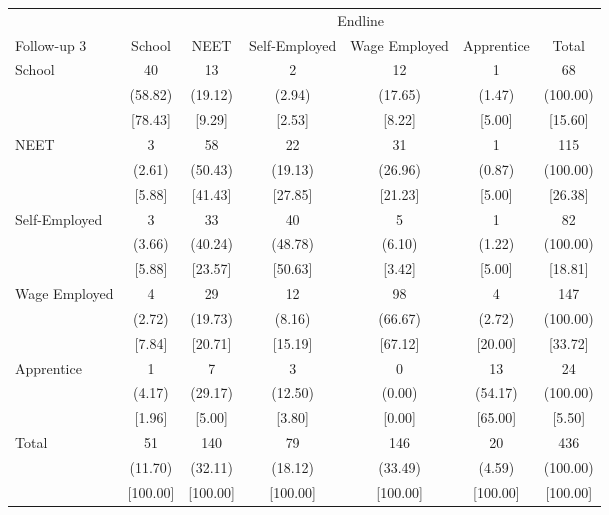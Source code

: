{
\def\sym#1{\ifmmode^{#1}\else\(^{#1}\)\fi}
\begin{tabular}{l*{6}{c}}
\hline\hline
            &\multicolumn{6}{c}{Endline}                                                  \\
Follow-up 3 &      School&        NEET&Self-Employed&Wage Employed&  Apprentice&       Total\\
\hline
School      &          40&          13&           2&          12&           1&          68\\
            &     (58.82)&     (19.12)&      (2.94)&     (17.65)&      (1.47)&    (100.00)\\
            &     [78.43]&      [9.29]&      [2.53]&      [8.22]&      [5.00]&     [15.60]\\
NEET        &           3&          58&          22&          31&           1&         115\\
            &      (2.61)&     (50.43)&     (19.13)&     (26.96)&      (0.87)&    (100.00)\\
            &      [5.88]&     [41.43]&     [27.85]&     [21.23]&      [5.00]&     [26.38]\\
Self-Employed&           3&          33&          40&           5&           1&          82\\
            &      (3.66)&     (40.24)&     (48.78)&      (6.10)&      (1.22)&    (100.00)\\
            &      [5.88]&     [23.57]&     [50.63]&      [3.42]&      [5.00]&     [18.81]\\
Wage Employed&           4&          29&          12&          98&           4&         147\\
            &      (2.72)&     (19.73)&      (8.16)&     (66.67)&      (2.72)&    (100.00)\\
            &      [7.84]&     [20.71]&     [15.19]&     [67.12]&     [20.00]&     [33.72]\\
Apprentice  &           1&           7&           3&           0&          13&          24\\
            &      (4.17)&     (29.17)&     (12.50)&      (0.00)&     (54.17)&    (100.00)\\
            &      [1.96]&      [5.00]&      [3.80]&      [0.00]&     [65.00]&      [5.50]\\
Total       &          51&         140&          79&         146&          20&         436\\
            &     (11.70)&     (32.11)&     (18.12)&     (33.49)&      (4.59)&    (100.00)\\
            &    [100.00]&    [100.00]&    [100.00]&    [100.00]&    [100.00]&    [100.00]\\
\hline\hline
\end{tabular}
}
